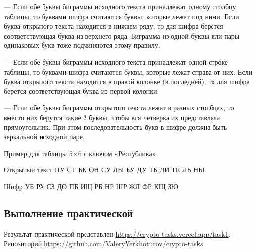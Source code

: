 --- Если обе буквы биграммы исходного текста принадлежат одному
столбцу таблицы, то буквами шифра считаются буквы, которые лежат под
ними. Если буква открытого текста находится в нижнем ряду, то для шифра
берется соответствующая буква из верхнего ряда. Биграмма из одной буквы
или пары одинаковых букв тоже подчиняются этому правилу.

--- Если обе буквы биграммы исходного текста принадлежат одной строке
таблицы, то буквами шифра считаются буквы, которые лежат справа от них.
Если буква открытого текста находится в правой колонке (в последней), то для
шифра берется соответствующая буква из первой колонки.

--- Если обе буквы биграммы открытого текста лежат в разных столбцах,
то вместо них берутся такие 2 буквы, чтобы вся четверка их представляла
прямоугольник. При этом последовательность букв в шифре должна быть
зеркальной исходной паре.

Пример для таблицы 5×6 с ключом «Республика» 

Открытый текст ПУ СТ ЬК ОН СУ ЛЫ БУ ДУ ТБ ДИ ТЕ ЛЬ НЫ

Шифр УБ РХ СЗ ДО ПБ ИЩ РБ НР ШР ЖЛ ФР КЩ ЗЮ

\subsection{Выполнение практической}

Результат практической представлен \url{https://crypto-tasks.vercel.app/task1}.
Репозиторий \url{https://github.com/ValeryVerkhoturov/crypto-tasks}.

